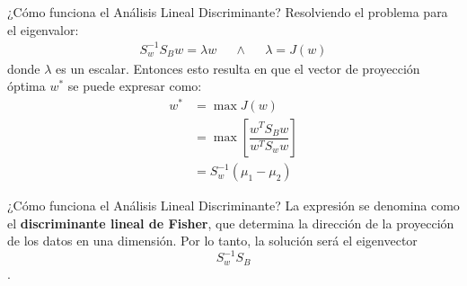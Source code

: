 \documentclass[11pt,aspectratio=169]{beamer}
\begin{document}
\begin{frame}{¿Cómo funciona el Análisis Lineal Discriminante?}
Resolviendo el problema para el eigenvalor:
\begin{align*}
	S_w^{-1}S_Bw = \lambda w && \wedge && \lambda = J(w)
\end{align*}
donde $\lambda$ es un escalar. Entonces esto resulta en que el vector de proyección óptima $w^*$ se puede expresar como:
\begin{align}
	w^* &= \max J(w)\nonumber\\
		&= \max \left[\dfrac{w^TS_Bw}{w^TS_ww}\right]\nonumber\\
		&= S_w^{-1}(\mu_1-\mu_2)
	\label{eq:fisherLD}
\end{align}
\end{frame}

\begin{frame}{¿Cómo funciona el Análisis Lineal Discriminante?}
La expresión se denomina como el \textbf{discriminante lineal de Fisher}, que determina la dirección de la proyección de 
los datos en una dimensión. Por lo tanto, la solución será el eigenvector 
\[S_w^{-1}S_B\].
\end{frame}
\end{document}
